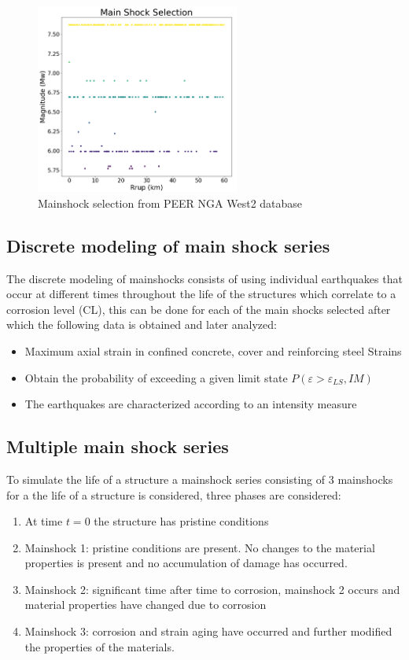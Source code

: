 \begin{figure}[htbp]
	\centering
	\includegraphics[width=0.6\textwidth]{Chapter-4/figs/MainShock_Selection}
	\caption{Mainshock selection from PEER NGA West2 database}
	\label{fig:MS_Selection}
\end{figure}

\subsection{Discrete modeling of main shock series}
The discrete modeling of mainshocks consists of using individual earthquakes that occur at different times throughout the life of the structures which correlate to a corrosion level (CL), this can be done for each of the main shocks selected after which the following data is obtained and later analyzed:

\begin{itemize}
	\item Maximum axial strain in confined concrete, cover and reinforcing steel 
Strains
	\item Obtain the probability of exceeding a given limit state $P(\varepsilon >\varepsilon_{LS},IM)$
	\item The earthquakes are characterized according to an intensity measure

\end{itemize}


\subsection{Multiple main shock series}

To simulate the life of a structure a mainshock series consisting of 3 mainshocks for a the life of a structure is considered, three phases are considered:
\begin{enumerate}

	\item At time $t=0$ the structure has pristine conditions
	\item Mainshock 1: pristine conditions are present. No changes to the material properties is present and no accumulation of damage has occurred.
	\item Mainshock 2: significant time after time to corrosion, mainshock 2 occurs and  material properties have changed due to corrosion
	\item Mainshock 3: corrosion and strain aging have occurred and further modified the properties of the materials.
\end{enumerate}

